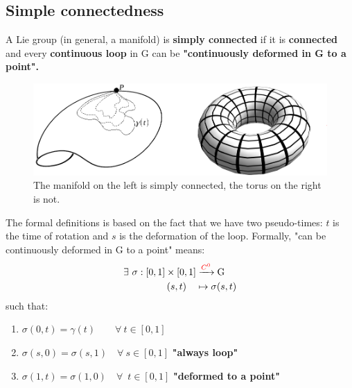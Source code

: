 \documentclass[../main.tex]{subfiles}
\begin{document}
\subsection{Simple connectedness}
\begin{definition}{}
A Lie group (in general, a manifold) is \textbf{simply connected} if it is \textbf{connected} and every \textbf{continuous loop} in G can be \textbf{"continuously deformed in G to a point".}
\end{definition}
\begin{figure}[h!]
    \includegraphics[width=\textwidth]{images/simplyconnected.pdf}
    \caption{The manifold on the left is simply connected, the torus on the right is not.}
\end{figure}
The formal definitions is based on the fact that we have two pseudo-times: $t$ is the time of rotation and $s$ is the deformation of the loop. Formally, "can be continuously deformed in G to a point" means: 
\begin{align*}
\exists \ \sigma:[0,1]\times[0,1]&\xrightarrow[]{{\color{red}C^0}}\text{G}\\
(s,t)\quad &\mapsto\sigma(s,t)
\end{align*}
such that:
\begin{enumerate}
    \item $\sigma(0,t)=\gamma(t)\qquad \forall \ t\in[0,1]$
    \item $\sigma(s,0)=\sigma(s,1)\quad \forall \ s\in[0,1]$ \textbf{ "always loop"}
    \item $\sigma(1,t)=\sigma(1,0)\quad \forall \;\ t\in[0,1]$ \textbf{ "deformed to a point"}
\end{enumerate}
\end{document}
